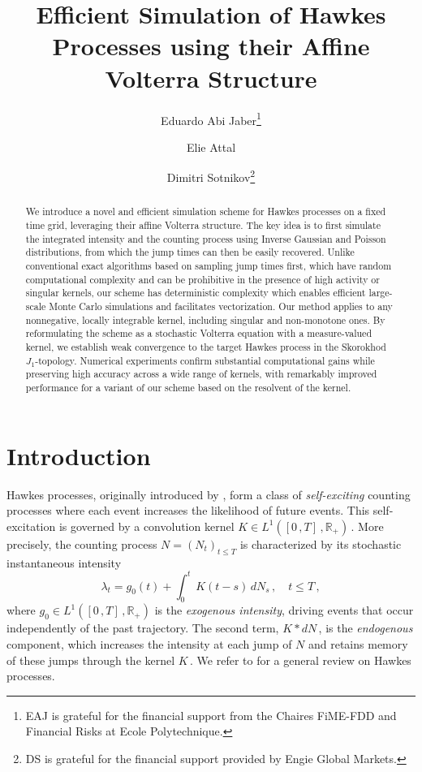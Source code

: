 \documentclass{article}
\title{Efficient Simulation of Hawkes Processes using their Affine Volterra Structure
}
\author[1]{Eduardo Abi Jaber\thanks{EAJ is grateful for the financial support from the Chaires FiME-FDD and Financial Risks at Ecole Polytechnique.}}
\author[1]{Elie Attal}
\author[1, 2]{Dimitri Sotnikov\thanks{DS is grateful for the financial support provided by Engie Global Markets.}}
\affil[1]{Ecole Polytechnique, CMAP}
\affil[2]{Engie Global Markets}
\newcommand{\R}{\mathbb{R}}
\newcommand{\1}{\mathbbm{1}}
\numberwithin{equation}{section}
\begin{document}
\maketitle

\begin{abstract}
    We introduce a novel and efficient simulation scheme for Hawkes processes on a fixed time grid, leveraging their affine Volterra structure. The key idea is to first simulate the integrated intensity and the counting process using Inverse Gaussian and Poisson distributions, from which the jump times can then be easily recovered. Unlike conventional exact algorithms based on sampling jump times first, which have random computational complexity and can be prohibitive in the presence of high activity or singular kernels, our scheme has deterministic complexity which enables efficient large-scale Monte Carlo simulations and facilitates vectorization. Our method applies to any nonnegative, locally integrable kernel, including singular and non-monotone ones. By reformulating the scheme as a stochastic Volterra equation with a measure-valued kernel, we establish weak convergence to the target Hawkes process in the Skorokhod $J_1$-topology. Numerical experiments confirm substantial computational gains while preserving high accuracy across a wide range of kernels, with remarkably improved performance for a variant of our scheme based on the resolvent of the kernel.
\end{abstract}


\section{Introduction}
Hawkes processes, originally introduced by \citet{hawkes1971spectra}, form a class of \textit{self-exciting} counting processes where each event increases the likelihood of future events. This self-excitation is governed by a convolution kernel $K \in L^1([0\,,T]\,, \R_+)\,$. More precisely, the  counting process $N = \left(N_t\right)_{t \leq T}$ is characterized by its stochastic instantaneous intensity
\begin{equation}
\label{eq:intensity}
\lambda_t = g_0(t) + \int_0^t\,K(t-s)\,dN_s\,,\quad t \leq T\,,
\end{equation}
where $g_0 \in L^1([0\,,T]\,, \mathbb R_+)$ is the \textit{exogenous intensity}, driving events that occur independently of the past trajectory. The second term, $K * dN\,$, is the \textit{endogenous} component, which increases the intensity at each jump of $N$ and retains memory of these jumps through the kernel $K\,$. We refer to \citet*{laub2025hawkes} for a general review on Hawkes processes.
\end{document}
